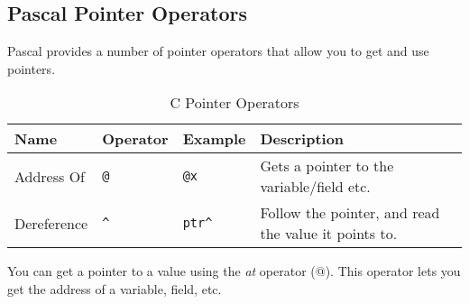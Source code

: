 \clearpage

\subsection{Pascal Pointer Operators} %
\label{sub:pas_pointer_operators}

Pascal provides a number of pointer operators that allow you to get and use pointers.

\begin{table}[h]
  \centering
  \begin{tabular}{|l|l|l|p{8cm}|}
    \hline
    \textbf{Name} & \textbf{Operator}  & \textbf{Example}  & \textbf{Description} \\
    \hline
    Address Of & \texttt{@} & \texttt{@x} & Gets a pointer to the variable/field etc. \\
    \hline
    Dereference & \texttt{\^} & \texttt{ptr\^} & Follow the pointer, and read the value it points to.\\
    \hline
  \end{tabular}
  \caption{C Pointer Operators}
  \label{tbl:c-ptr-operators}
\end{table}

You can get a pointer to a value using the \emph{at} operator (@). This operator lets you get the address of a variable, field, etc.



